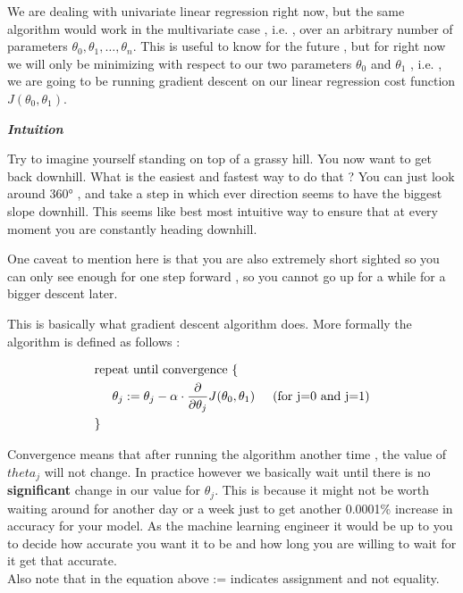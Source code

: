 We are dealing with univariate linear regression right now, but the same
algorithm would work in the multivariate case , i.e. , over an arbitrary number
of parameters \( \theta_0 , \theta_1 , \ldots , \theta_n \). This is useful to
know for the future , but for right now we will only be minimizing with respect
to our two parameters \( \theta_0 \) and \( \theta_1 \) , i.e. , we are going to
be running gradient descent on our linear regression cost function \(
	J(\theta_0,\theta_1) \).

\textbf{\textit{Intuition}}

Try to imagine yourself standing on top of a grassy hill. You now want to get
back downhill. What is the easiest and fastest way to do that ?  You can just
look around 360° , and take a step in which ever direction seems to have the
biggest slope downhill.  This seems like best most intuitive way to ensure that
at every moment you are constantly heading downhill.

One caveat to mention here is that you are also extremely short sighted
so you can only see enough for one step forward , so you cannot go up for a
while for a bigger descent later.

This is basically what gradient descent algorithm does. More formally
the algorithm is defined as follows :

\[ 
\begin{aligned} 
	& \text{repeat until convergence  }
	\{ \\ 
	& \hspace{0.5cm}
	\theta_j :=
	\theta_j
	- \alpha
	\cdot \frac{\partial}{\partial \theta_j} J(\theta_0,\theta_1) 
	\hspace{0.5cm} 
	\text{(for j=0 and j=1)} 
	\\
	&
	\} \\
\end{aligned}
\]

Convergence means that after running the algorithm another time , the
value of \( theta_j \) will not change. In practice however we basically wait
until there is no \textbf {significant} change in our value for \( \theta_j \).
This is because it might not be worth waiting around for another day or a week
just to get another 0.0001\% increase in accuracy for your model. As the machine
learning engineer it would be up to you to decide how accurate you want it to be
and how long you are willing to wait for it get that accurate.\\

Also note that in the equation above := indicates assignment and not equality.\\



